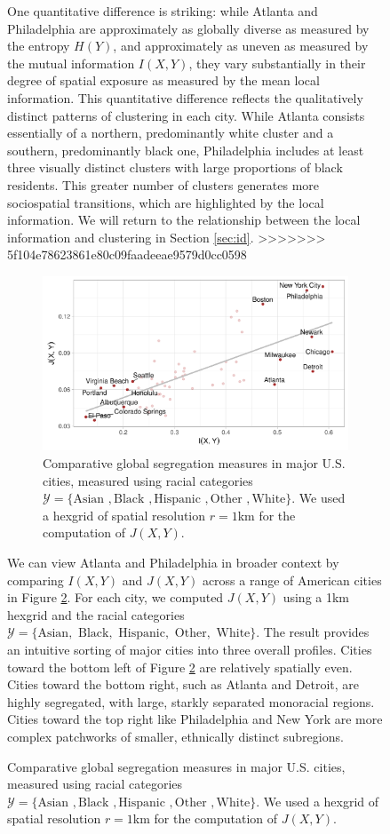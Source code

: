 \documentclass[english]{scrartcl}
\begin{document}
\begin{figure}
		One quantitative difference is striking: while Atlanta and Philadelphia are approximately as globally diverse as measured by the entropy $H(Y)$, and approximately as uneven as measured by the mutual information $I(X,Y)$, they vary substantially in their degree of spatial exposure as measured by the mean local information. This quantitative difference reflects the qualitatively distinct patterns of clustering in each city. While Atlanta consists essentially of a northern, predominantly white cluster and a southern, predominantly black one, Philadelphia includes at least three visually distinct clusters with large proportions of black residents. This greater number of clusters generates more sociospatial transitions, which are highlighted by the local information. We will return to the relationship between the local information and clustering in Section \ref{sec:id}. 
>>>>>>> 5f104e78623861e80c09faadeeae9579d0cc0598

		\begin{figure}
			\includegraphics[width=\textwidth]{figs/mutual_fisher.pdf}
			\caption{Comparative global segregation measures in major U.S. cities, measured using racial categories $\mathcal{Y} = \{\text{Asian }, \text{Black }, \text{Hispanic }, \text{Other }, \text{White}\}$. We used a hexgrid of spatial resolution $r = 1$km for the computation of $J(X,Y)$.} \label{fig:mutual_fisher}
		\end{figure}

		We can view Atlanta and Philadelphia in broader context by comparing $I(X,Y)$ and $J(X,Y)$ across a range of American cities in Figure \ref{fig:mutual_fisher}. For each city, we computed $J(X,Y)$ using a 1km hexgrid and the racial categories $\mathcal{Y} = \{\text{Asian}, \text{ Black}, \text{ Hispanic}, \text{ Other}, \text{ White}\}$. The result provides an intuitive sorting of major cities into three overall profiles. Cities toward the bottom left of Figure \ref{fig:mutual_fisher} are relatively spatially even. Cities toward the bottom right, such as Atlanta and Detroit, are highly segregated, with large, starkly separated monoracial regions. Cities toward the top right like Philadelphia and New York are more complex patchworks of smaller, ethnically distinct subregions.  


\end{figure}
\end{document}

